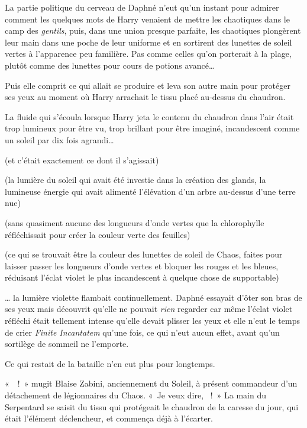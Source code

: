 La partie politique du cerveau de Daphné n'eut qu'un instant pour admirer comment les quelques mots de Harry venaient de mettre les chaotiques dans le camp des \emph{gentils}, puis, dans une union presque parfaite, les chaotiques plongèrent leur main dans une poche de leur uniforme et en sortirent des lunettes de soleil vertes à l'apparence peu familière. Pas comme celles qu'on porterait à la plage, plutôt comme des lunettes pour cours de potions avancé…

Puis elle comprit ce qui allait se produire et leva son autre main pour protéger ses yeux au moment où Harry arrachait le tissu placé au-dessus du chaudron.

La fluide qui s'écoula lorsque Harry jeta le contenu du chaudron dans l'air était trop lumineux pour être vu, trop brillant pour être imaginé, incandescent comme un soleil par dix fois agrandi…

(et c'était exactement ce dont il s'agissait)

(la lumière du soleil qui avait été investie dans la création des glands, la lumineuse énergie qui avait alimenté l'élévation d'un arbre au-dessus d'une terre nue)

(sans quasiment aucune des longueurs d'onde vertes que la chlorophylle réfléchissait pour créer la couleur verte des feuilles)

(ce qui se trouvait être la couleur des lunettes de soleil de Chaos, faites pour laisser passer les longueurs d'onde vertes et bloquer les rouges et les bleues, réduisant l'éclat violet le plus incandescent à quelque chose de supportable)

… la lumière violette flambait continuellement. Daphné essayait d'ôter son bras de ses yeux mais découvrit qu'elle ne pouvait \emph{rien} regarder car même l'éclat violet réfléchi était tellement intense qu'elle devait plisser les yeux et elle n'eut le temps de crier \emph{Finite Incantatem} qu'une fois, ce qui n'eut aucun effet, avant qu'un sortilège de sommeil ne l'emporte.

Ce qui restait de la bataille n'en eut plus pour longtemps.

\later

«~~!~» mugit Blaise Zabini, anciennement du Soleil, à présent commandeur d'un détachement de légionnaires du Chaos. «~Je veux dire, ~!~» La main du Serpentard se saisit du tissu qui protégeait le chaudron de la caresse du jour, qui était l'élément déclencheur, et commença déjà à l'écarter.

